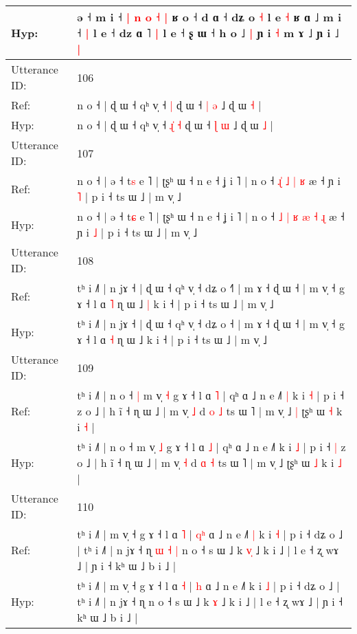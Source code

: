 \documentclass[10pt]{article}
\DeclareRobustCommand{\hl}[1]{{\textcolor{red}{#1}}}
\begin{document}
\begin{longtable}{ll}
Hyp: & ə ˧ m i ˧ \hl{|} \hl{n} \hl{o} \hl{}\hl{˧} \hl{|} ʁ o ˧ d ɑ ˧ dʑ o \hl{˧} l e\hl{ }\hl{˧} ʁ ɑ ˩ m i ˧\hl{ }\hl{|} l e ˧ dz ɑ ˥\hl{ }\hl{|} l e ˧ ʂ ɯ ˧ h o ˩\hl{ }\hl{|} ɲ i \hl{˧} m ɤ ˩ ɲ i ˩\hl{ }\hl{|}
 \\
\midrule
Utterance ID: & 106 \\
Ref: & n o ˧ | ɖ ɯ ˧ qʰ v̩ ˧\hl{}\hl{}\hl{} \hl{|} ɖ ɯ ˧ \hl{|} \hl{ə} ˩ ɖ ɯ \hl{˧} |
 \\
Hyp: & n o ˧ | ɖ ɯ ˧ qʰ v̩ ˧\hl{ }\hl{ɻ}\hl{̍} \hl{˧} ɖ ɯ ˧ \hl{ɭ} \hl{ɯ} ˩ ɖ ɯ \hl{˩} |
 \\
\midrule
Utterance ID: & 107 \\
Ref: & n o ˧ | ə ˧ t\hl{s} e ˥ | ʈʂʰ ɯ ˧ n e ˧ ʝ i ˥ | n o ˧\hl{}\hl{} \hl{}\hl{ɻ}\hl{̍} \hl{˩} \hl{|} \hl{ʁ} æ ˧ ɲ i \hl{˥} | p i ˧ ts ɯ ˩ | m v̩ ˩
 \\
Hyp: & n o ˧ | ə ˧ t\hl{ɕ} e ˥ | ʈʂʰ ɯ ˧ n e ˧ ʝ i ˥ | n o ˧\hl{ }\hl{˩} \hl{|}\hl{ }\hl{ʁ} \hl{æ} \hl{˧} \hl{ɻ} æ ˧ ɲ i \hl{˩} | p i ˧ ts ɯ ˩ | m v̩ ˩
 \\
\midrule
Utterance ID: & 108 \\
Ref: & tʰ i ˩˥ | n jɤ ˧ | ɖ ɯ ˧ qʰ v̩ ˧ dʑ o ˧\hl{˥} | m ɤ ˧ ɖ ɯ ˧ | m v̩ ˧ g ɤ ˧ l ɑ \hl{˥} ɳ ɯ ˩\hl{ }\hl{|} k i ˧ | p i ˧ ts ɯ ˩ | m v̩ ˩
 \\
Hyp: & tʰ i ˩˥ | n jɤ ˧ | ɖ ɯ ˧ qʰ v̩ ˧ dʑ o ˧\hl{} | m ɤ ˧ ɖ ɯ ˧ | m v̩ ˧ g ɤ ˧ l ɑ \hl{˧} ɳ ɯ ˩\hl{}\hl{} k i ˧ | p i ˧ ts ɯ ˩ | m v̩ ˩
 \\
\midrule
Utterance ID: & 109 \\
Ref: & tʰ i ˩˥ | n o ˧\hl{ }\hl{|} m v̩ \hl{˧} g ɤ ˧ l ɑ \hl{˥} | qʰ ɑ ˩ n e ˩˥\hl{ }\hl{|} k i \hl{˧} | p i ˧\hl{}\hl{} z o ˩ | h ĩ ˧ ɳ ɯ ˩ | m v̩ \hl{˩} d \hl{o} \hl{˩} ts ɯ ˥ | m v̩ ˩\hl{ }\hl{|} ʈʂʰ ɯ \hl{˧} k i \hl{˧} |
 \\
Hyp: & tʰ i ˩˥ | n o ˧\hl{}\hl{} m v̩ \hl{˩} g ɤ ˧ l ɑ \hl{˩} | qʰ ɑ ˩ n e ˩˥\hl{}\hl{} k i \hl{˩} | p i ˧\hl{ }\hl{|} z o ˩ | h ĩ ˧ ɳ ɯ ˩ | m v̩ \hl{˧} d \hl{ɑ} \hl{˧} ts ɯ ˥ | m v̩ ˩\hl{}\hl{} ʈʂʰ ɯ \hl{˩} k i \hl{˩} |
 \\
\midrule
Utterance ID: & 110 \\
Ref: & tʰ i ˩˥ | m v̩ ˧ g ɤ ˧ l ɑ \hl{˥} | \hl{q}\hl{ʰ} ɑ ˩ n e ˩˥\hl{ }\hl{|} k i \hl{˧} | p i ˧ dʑ o ˩ | tʰ i ˩˥ | n jɤ ˧ ɳ\hl{ }\hl{ɯ}\hl{ }\hl{˧}\hl{ }\hl{|} n o ˧ s ɯ ˩ k \hl{v}\hl{̩} ˩ k i ˩ | l e ˧ ʐ wɤ ˩ | ɲ i ˧ kʰ ɯ ˩ b i ˩ |
 \\
Hyp: & tʰ i ˩˥ | m v̩ ˧ g ɤ ˧ l ɑ \hl{˧} | \hl{}\hl{h} ɑ ˩ n e ˩˥\hl{}\hl{} k i \hl{˩} | p i ˧ dʑ o ˩ | tʰ i ˩˥ | n jɤ ˧ ɳ\hl{}\hl{}\hl{}\hl{}\hl{}\hl{} n o ˧ s ɯ ˩ k \hl{}\hl{ɤ} ˩ k i ˩ | l e ˧ ʐ wɤ ˩ | ɲ i ˧ kʰ ɯ ˩ b i ˩ |

\end{longtable}
\end{document}
